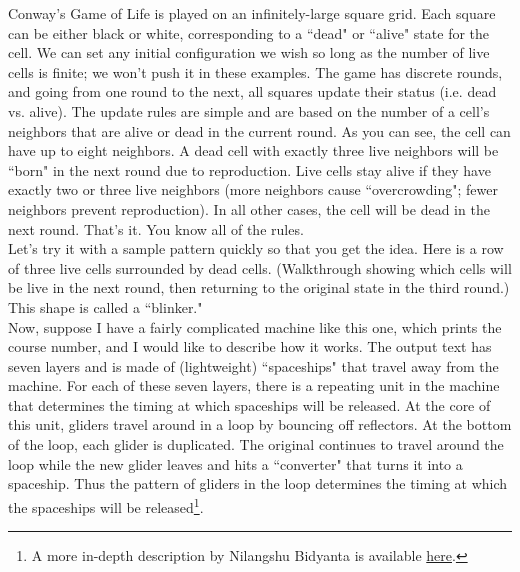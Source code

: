 \documentclass{article}
\begin{document}
Conway's Game of Life is played on an infinitely-large square grid. Each square can be either black or white, corresponding to a ``dead" or ``alive" state for the cell. We can set any initial configuration we wish so long as the number of live cells is finite; we won't push it in these examples. The game has discrete rounds, and going from one round to the next, all squares update their status (i.e. dead vs. alive). The update rules are simple and are based on the number of a cell's neighbors that are alive or dead in the current round. As you can see, the cell can have up to eight neighbors. A dead cell with exactly three live neighbors will be ``born" in the next round due to reproduction. Live cells stay alive if they have exactly two or three live neighbors (more neighbors cause ``overcrowding"; fewer neighbors prevent reproduction). In all other cases, the cell will be dead in the next round. That's it. You know all of the rules.\\

Let's try it with a sample pattern quickly so that you get the idea. Here is a row of three live cells surrounded by dead cells. (Walkthrough showing which cells will be live in the next round, then returning to the original state in the third round.) This shape is called a ``blinker."\\


Now, suppose I have a fairly complicated machine like this one, which prints the course number, and I would like to describe how it works. The output text has seven layers and is made of (lightweight) ``spaceships" that travel away from the machine. For each of these seven layers, there is a repeating unit in the machine that determines the timing at which spaceships will be released. At the core of this unit, gliders travel around in a loop by bouncing off reflectors. At the bottom of the loop, each glider is duplicated. The original continues to travel around the loop while the new glider leaves and hits a ``converter" that turns it into a spaceship. Thus the pattern of gliders in the loop determines the timing at which the spaceships will be released\footnote{A more in-depth description by Nilangshu Bidyanta is available \href{http://www.binarydigits10.com/articles/conwaysgameoflife}{here}.}.\\
\end{document}
